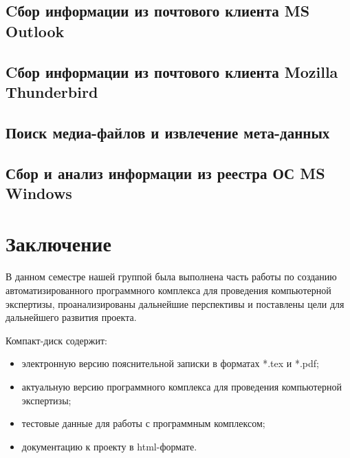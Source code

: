 \newpage
\subsection{Cбор информации из почтового клиента MS Outlook} %


\newpage
\subsection{Cбор информации из почтового клиента Mozilla Thunderbird}  %


\newpage
\subsection{Поиск медиа-файлов и извлечение мета-данных} %


\newpage 
\subsection{Сбор и анализ информации из реестра ОС MS Windows} %


\newpage
\section*{Заключение}
В данном семестре нашей группой была выполнена часть работы по созданию автоматизированного программного комплекса для проведения компьютерной экспертизы, проанализированы дальнейшие перспективы и поставлены цели для дальнейшего развития проекта.
 
 
 \newpage
 \renewcommand{\refname}{Список использованных источников}
 

 Компакт-диск содержит: 
 \begin{itemize}
 \item электронную версию пояснительной записки в форматах *.tex и *.pdf;
 \item актуальную версию программного комплекса для проведения компьютерной экспертизы;
 \item тестовые данные для работы с программным комплексом;
 \item документацию к проекту в html-формате.
 \end{itemize}
 

